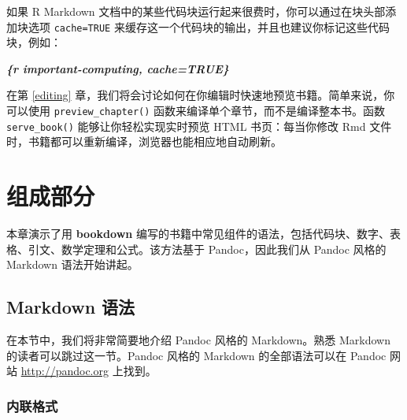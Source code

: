 \documentclass[
  12pt,
]{krantz}
\newenvironment{Shaded}{\begin{snugshade}}{\end{snugshade}}
\newcommand{\InformationTok}[1]{\textcolor[rgb]{0.56,0.35,0.01}{\textbf{\textit{#1}}}}
\theoremstyle{definition}
\theoremstyle{definition}
\theoremstyle{definition}
\theoremstyle{definition}
\theoremstyle{remark}
\begin{document}
如果 R Markdown 文档中的某些代码块运行起来很费时，你可以通过在块头部添加块选项 \texttt{cache=TRUE} 来缓存这一个代码块的输出，并且也建议你标记这些代码块，例如：

\begin{Shaded}
\begin{Highlighting}[]
\InformationTok{\textasciigrave{}\textasciigrave{}\textasciigrave{}\{r important{-}computing, cache=TRUE\}}
\end{Highlighting}
\end{Shaded}

在第 \ref{editing} 章，我们将会讨论如何在你编辑时快速地预览书籍。简单来说，你可以使用 \texttt{preview\_chapter()} 函数来编译单个章节，而不是编译整本书。函数 \texttt{serve\_book()} 能够让你轻松实现实时预览 HTML 书页：每当你修改 Rmd 文件时，书籍都可以重新编译，浏览器也能相应地自动刷新。

\hypertarget{components}{%
\chapter{组成部分}\label{components}}

本章演示了用 \textbf{bookdown} 编写的书籍中常见组件的语法，包括代码块、数字、表格、引文、数学定理和公式。该方法基于 Pandoc，因此我们从 Pandoc 风格的 Markdown 语法开始讲起。

\hypertarget{markdown-syntax}{%
\section{Markdown 语法}\label{markdown-syntax}}

在本节中，我们将非常简要地介绍 Pandoc 风格的 Markdown。熟悉 Markdown 的读者可以跳过这一节。Pandoc 风格的 Markdown 的全部语法可以在 Pandoc 网站 \url{http://pandoc.org} 上找到。

\hypertarget{ux5185ux8054ux683cux5f0f}{%
\subsection{内联格式}\label{ux5185ux8054ux683cux5f0f}}
\end{document}
